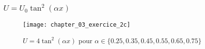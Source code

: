 \subsubsection{$U = U_{0}\tan^{2}(\alpha x)$}

\begin{figure}[htb!]
	\begin{center}
		\texttt{[image: chapter\_03\_exercice\_2c]}
		\caption{$U = 4\tan^{2}(\alpha x)$ pour $\alpha \in \{0.25,0.35,0.45,0.55,0.65,0.75\}$}\label{FIG:3_2_c}
	\end{center}
\end{figure}